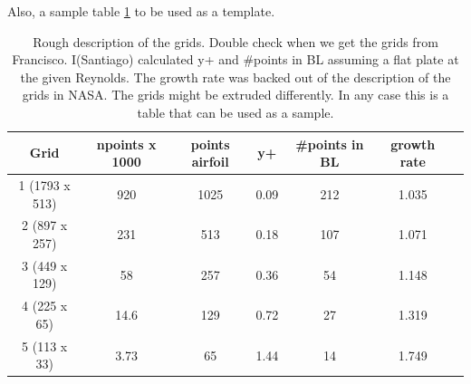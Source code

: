 Also, a sample table \cref{tab:sample_table} to be used as a template.
\begin{table}
  \centering
  \begin{tabular}{ccccccc} \\ \toprule
  Grid & npoints x 1000 & points airfoil & y+ & \#points in BL & growth rate  \\ \midrule
  1 (1793 x 513) & 920 & 1025 & 0.09 & 212 & 1.035\\
  2 (897 x 257) & 231 & 513 & 0.18 & 107 & 1.071\\
  3 (449 x 129) & 58 & 257 & 0.36 & 54 & 1.148\\
  4 (225 x 65) & 14.6 & 129 & 0.72 & 27 & 1.319\\
  5 (113 x 33) & 3.73 & 65 & 1.44 & 14 & 1.749\\ \bottomrule
  \end{tabular}
  \caption{Rough description of the grids. Double check when we get the grids from Francisco.  I(Santiago) calculated y+ and \#points in BL assuming a flat plate at the given Reynolds. The growth rate was backed out of the description of the grids in NASA. The grids might be extruded differently. In any case this is a table that can be used as a sample.}
  \label{tab:sample_table}
\end{table}
